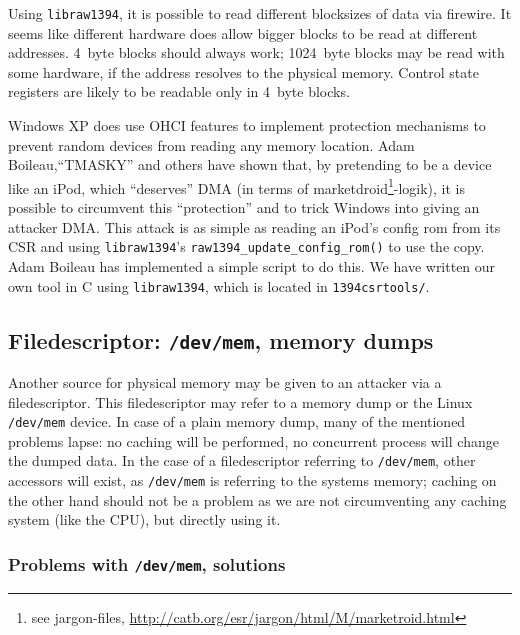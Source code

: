 
Using \texttt{libraw1394}, it is possible to read different blocksizes of data
via firewire. It seems like different hardware does allow bigger blocks to be
read at different addresses. 4~byte blocks should always work; 1024~byte blocks
may be read with some hardware, if the address resolves to the physical memory.
Control state registers are likely to be readable only in 4~byte blocks.

\label{windows-dma} Windows XP does use OHCI features to implement protection
mechanisms to prevent random devices from reading any memory location. Adam
Boileau,``TMASKY'' and others have shown \cite{rux2k6firewire:2006} that, by
pretending to be a device like an iPod, which ``deserves'' DMA (in terms of
marketdroid\footnote{see jargon-files,
\href{http://catb.org/esr/jargon/html/M/marketroid.html}
{http://catb.org/esr/jargon/html/M/marketroid.html}}-logik), it is possible to
circumvent this ``protection'' and to trick Windows into giving an attacker DMA.
This attack is as simple as reading an iPod's config rom from its CSR and using
\texttt{libraw1394}'s \texttt{raw1394\_update\_config\_rom()} to use the copy.
Adam Boileau has implemented a simple script to do this. We have written our own
tool in C using \texttt{libraw1394}, which is located in \texttt{1394csrtools/}.



\subsection{Filedescriptor: \texttt{/dev/mem}, memory dumps}

Another source for physical memory may be given to an attacker via a
filedescriptor. This filedescriptor may refer to a memory dump or the Linux
\texttt{/dev/mem} device. In case of a plain memory dump, many of the mentioned
problems lapse: no caching will be performed, no concurrent process will change
the dumped data. In the case of a filedescriptor referring to \texttt{/dev/mem},
other accessors will exist, as \texttt{/dev/mem} is referring to the systems
memory; caching on the other hand should not be a problem as we are not
circumventing any caching system (like the CPU), but directly using it.

\subsubsection{Problems with \texttt{/dev/mem}, solutions}

